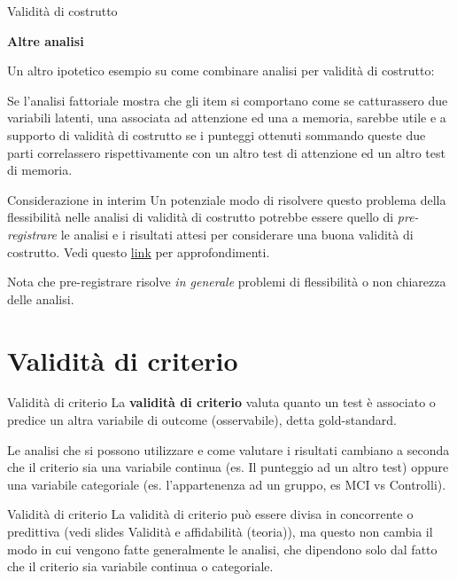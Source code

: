 \documentclass[
  ignorenonframetext,
  aspectratio=169,
]{beamer}
\begin{document}
\begin{frame}{Validità di costrutto}
\label{validituxe0-di-costrutto-23}
\begin{center}
  \textbf{Altre analisi}
\end{center}
\vspace{2em}

Un altro ipotetico esempio su come combinare analisi per validità di
costrutto:

Se l'analisi fattoriale mostra che gli item si comportano come se
catturassero due variabili latenti, una associata ad attenzione ed una a
memoria, sarebbe utile e a supporto di validità di costrutto se i
punteggi ottenuti sommando queste due parti correlassero rispettivamente
con un altro test di attenzione ed un altro test di memoria.
\end{frame}

\begin{frame}{Considerazione in interim}
\label{considerazione-in-interim}
Un potenziale modo di risolvere questo problema della flessibilità nelle
analisi di validità di costrutto potrebbe essere quello di
\emph{pre-registrare} le analisi e i risultati attesi per considerare
una buona validità di costrutto. Vedi questo
\href{https://en.wikipedia.org/wiki/Preregistration_(science)}{link} per
approfondimenti.

Nota che pre-registrare risolve \emph{in generale} problemi di
flessibilità o non chiarezza delle analisi.
\end{frame}

\section{Validità di criterio}\label{validituxe0-di-criterio}

\begin{frame}{Validità di criterio}
\label{validituxe0-di-criterio-1}
La \textbf{validità di criterio} valuta quanto un test è associato o
predice un altra variabile di outcome (osservabile), detta
gold-standard.

Le analisi che si possono utilizzare e come valutare i risultati
cambiano a seconda che il criterio sia una variabile continua (es. Il
punteggio ad un altro test) oppure una variabile categoriale (es.
l'appartenenza ad un gruppo, es MCI vs Controlli).
\end{frame}

\begin{frame}{Validità di criterio}
\label{validituxe0-di-criterio-2}
La validità di criterio può essere divisa in concorrente o predittiva
(vedi slides Validità e affidabilità (teoria)), ma questo non cambia il
modo in cui vengono fatte generalmente le analisi, che dipendono solo
dal fatto che il criterio sia variabile continua o categoriale.
\end{frame}
\end{document}

